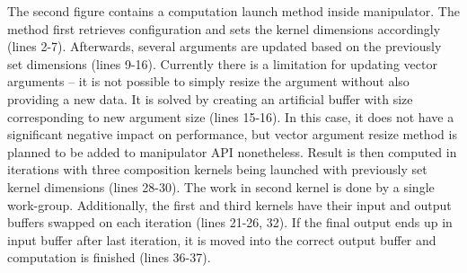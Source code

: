 \documentclass
[
    digital, %
    oneside, %
    table, %
    nolof, %
    nolot, %
    nocover %
]{fithesis3}
\begin{document}
The second figure contains a computation launch method inside manipulator. The method first retrieves configuration and sets the kernel dimensions
accordingly (lines 2-7). Afterwards, several arguments are updated based on the previously set dimensions (lines 9-16). Currently there is a limitation
for updating vector arguments -- it is not possible to simply resize the argument without also providing a new data. It is solved by creating an artificial
buffer with size corresponding to new argument size (lines 15-16). In this case, it does not have a significant negative impact on performance, but vector
argument resize method is planned to be added to manipulator API nonetheless. Result is then computed in iterations with three composition kernels being
launched with previously set kernel dimensions (lines 28-30). The work in second kernel is done by a single work-group. Additionally, the first and third
kernels have their input and output buffers swapped on each iteration (lines 21-26, 32). If the final output ends up in input buffer after last iteration,
it is moved into the correct output buffer and computation is finished (lines 36-37).
\end{document}
